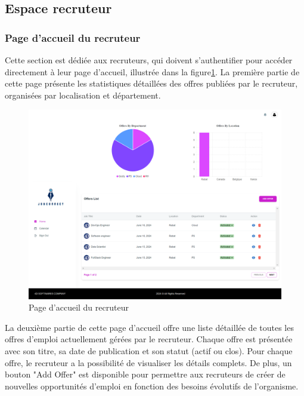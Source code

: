 \subsection{Espace recruteur}
\subsubsection{Page d'accueil du recruteur}
Cette section est dédiée aux recruteurs, qui doivent s'authentifier pour accéder 
directement à leur page d'accueil, illustrée dans la figure\ref{fig:homeRecr}. La première 
partie de cette page présente les statistiques détaillées des offres publiées 
par le recruteur, organisées par localisation et département. 

\begin{figure}[htbp]
   \centering
   \includegraphics[scale=0.18]{screens/homeRecr.png} 
   \caption{Page d'accueil du recruteur}
   \label{fig:homeRecr}
\end{figure}

La deuxième partie de cette page d'accueil offre une liste détaillée de toutes 
les offres d'emploi actuellement gérées par le recruteur. Chaque offre est 
présentée avec son titre, sa date de publication et son statut (actif ou clos). 
Pour chaque offre, le recruteur a la possibilité de visualiser les détails 
complets. De plus, un bouton "Add Offer" est 
disponible pour permettre aux recruteurs de créer de nouvelles opportunités 
d'emploi en fonction des besoins évolutifs de l'organisme.


